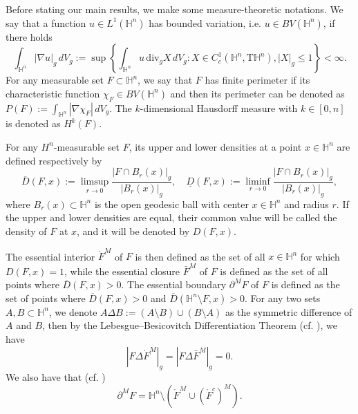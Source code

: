 \documentclass[11pt,reqno]{amsart}
\theoremstyle{definition}
\theoremstyle{remark}
\numberwithin{equation}{section}
\renewcommand{\(}{\left(}
\renewcommand{\)}{\right)}
\renewcommand{\-}{\overline}
\begin{document}
Before stating our main results, we make some measure-theoretic notations. We say that a function $u\in L^1(\mathbb{H}^n)$ has bounded variation, i.e. $u\in BV(\mathbb{H}^n)$, if there holds
\begin{equation*}
	\int_{\mathbb{H}^n}{|\nabla u|_g}\,dV_g:=\sup\left\{\int_{\mathbb{H}^n}u\,\mathrm{div}_g X\,dV_g: X\in C_c^1(\mathbb{H}^n,\mathrm{T}\mathbb{H}^n), |X|_g\leq 1\right\}<\infty.
\end{equation*}
For any measurable set $F\subset\mathbb{H}^n$, we say that $F$ has finite perimeter if its characteristic function $\chi_F\in BV(\mathbb{H}^n)$ and then its perimeter can be denoted as $P(F):=\int_{\mathbb{H}^n}{|\nabla\chi_F|}\,dV_g$. The $k$-dimensional Hausdorff measure with $k\in[0,n]$ is denoted as $H^k(F)$.

For any $H^n$-measurable set $F$, its upper and lower densities at a point $x\in\mathbb{H}^n$ are defined respectively by 
\begin{equation}\label{Defn-uppden}
	\overline{D}(F,x):=\limsup_{r\to 0}\frac{|F\cap B_r(x)|_g}{|B_r(x)|_g},\quad  \underline{D}(F,x):=\liminf_{r\to 0}\frac{|F\cap B_r(x)|_g}{|B_r(x)|_g},
\end{equation}
where $B_r(x)\subset\mathbb{H}^n$ is the open geodesic ball with center $x\in\mathbb{H}^n$ and radius $r$. If the upper and lower densities are equal, their common value will be called the density of $F$ at $x$, and it will be denoted by $D(F,x)$. 

The essential interior $\mathring{F}^M$ of $F$ is then defined as the set of all $x\in\mathbb{H}^n$ for which $D(F,x)=1$, while the essential closure $\bar{F}^{M}$ of $F$ is defined as the set of all points where $\overline{D}(F,x)>0$. The essential boundary $\partial^M F$ of $F$ is defined as the set of points where $\overline{D}(F,x)>0$ and $\overline{D}(\mathbb{H}^n\setminus F,x)>0$.  For any two sets $A, B\subset\mathbb{H}^n$, we denote $A\Delta B:=(A\setminus B)\cup (B\setminus A)$ as the symmetric difference of $A$ and $B$, then by the Lebesgue–Besicovitch Differentiation Theorem (cf. \cite[Theorem 1.32]{Evans15}), we have
\begin{equation*}
	|F\Delta\mathring{F}^M|_g=|F\Delta\bar{F}^{M}|_g=0.
\end{equation*}
We also have that (cf. \cite[Page 46]{Ambrosio01})
\begin{equation}\label{Eq-Essenb}
	\partial^M F=\mathbb{H}^n\setminus(\mathring{F}^M\cup(\mathring{F}^c)^M).
\end{equation}
\end{document}
